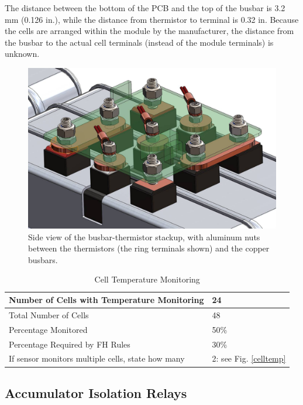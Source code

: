 \documentclass{article}
\begin{document}
     The distance between the bottom of the PCB and the top of the busbar is 3.2 mm (0.126 in.), while the distance from thermistor to terminal is 0.32 in. Because the cells are arranged within the module by the manufacturer, the distance from the busbar to the actual cell terminals (instead of the module terminals) is unknown.

     \begin{figure}[H]
         \centering
         \includegraphics[width = 0.6 \textwidth]{busbar_aluminum}
         \caption{Side view of the busbar-thermistor stackup, with aluminum nuts between the thermistors (the ring terminals shown) and the copper busbars.}
         \label{busbarthermistorstackup}
     \end{figure}


        \begin{table}[H]
            \centering
            \begin{tabular}{|l|l|}
            \hline
            Number of Cells with Temperature Monitoring &  24\\ \hline
            Total Number of Cells & 48 \\ \hline
            Percentage Monitored & 50\% \\ \hline
            Percentage Required by FH Rules & 30\% \\ \hline
            If sensor monitors multiple cells, state how many & 2: see Fig. \ref{celltemp} \\ \hline
            \end{tabular}
            \caption{Cell Temperature Monitoring}
            \label{celltempmonitoring}
        \end{table}

\subsection{Accumulator Isolation Relays}
\end{document}
